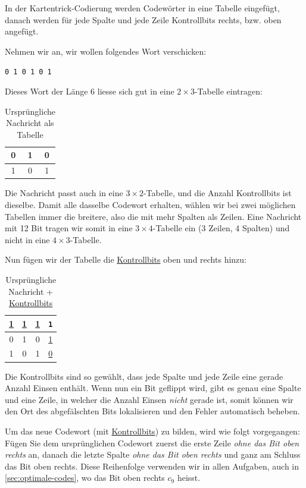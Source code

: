 \begin{mydefinition}[Kartentrick]\label{def:kartentrick}
In der Kartentrick-Codierung werden Codewörter in eine Tabelle eingefügt, danach werden für jede Spalte und jede Zeile Kontrollbits rechts, bzw. oben angefügt.

Nehmen wir an, wir wollen folgendes Wort verschicken:

\texttt{0 1 0 1 0 1}

Dieses Wort der Länge 6 liesse sich gut in eine $2\times3$-Tabelle eintragen:

\begin{table}[H]
    \centering
    \begin{tabular}{ccc}
        0 & 1 & 0 \\\midrule
        1 & 0 & 1 \\
    \end{tabular}
    \caption{Ursprüngliche Nachricht als Tabelle}
    \label{tab:ex-zauberer}
\end{table}

Die Nachricht passt auch in eine $3\times2$-Tabelle, und die Anzahl Kontrollbits ist dieselbe. Damit alle dasselbe Codewort erhalten, wählen wir bei zwei möglichen Tabellen immer die breitere, also die mit mehr Spalten als Zeilen. Eine Nachricht mit 12 Bit tragen wir somit in eine $3\times4$-Tabelle ein (3 Zeilen, 4 Spalten) und nicht in eine $4\times3$-Tabelle.

Nun fügen wir der Tabelle die \underline{Kontrollbits} oben und rechts hinzu:
\begin{table}[H]
    \centering
    \begin{tabular}{cccc}
        \underline{1} & \underline{1} & \underline{1} & \texttt{1}    \\\midrule
        0             & 1             & 0             & \underline{1} \\\midrule
        1             & 0             & 1             & \underline{0} \\
    \end{tabular}
    \caption{Ursprüngliche Nachricht + \underline{Kontrollbits}}
    \label{tab:ex-zauberer-parity}
\end{table}

Die Kontrollbits sind so gewählt, dass jede Spalte und jede Zeile eine gerade Anzahl Einsen enthält. Wenn nun ein Bit geflippt wird, gibt es genau eine Spalte und eine Zeile, in welcher die Anzahl Einsen \textit{nicht} gerade ist, somit können wir den Ort des abgefälschten Bits lokalisieren und den Fehler automatisch beheben.

Um das neue Codewort (mit \underline{Kontrollbits}) zu bilden, wird wie folgt vorgegangen: Fügen Sie dem ursprünglichen Codewort zuerst die erste Zeile \textit{ohne das Bit oben rechts} an, danach die letzte Spalte \textit{ohne das Bit oben rechts} und ganz am Schluss das Bit oben rechts. Diese Reihenfolge verwenden wir in allen Aufgaben, auch in \cref{sec:optimale-codes}, wo das Bit oben rechts \(c_9\) heisst.

\end{mydefinition}

